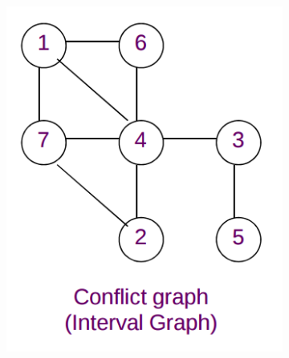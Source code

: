 \begin{figure}[H]
	\centering
	\begin{subfigure}[b]{0.19\textwidth}
		\includegraphics[width=\textwidth]{./Cap5/Images/Image11.png}
		\caption{}
		\label{fig:conflGraph}
	\end{subfigure}
	\quad\quad\quad
	\begin{subfigure}[b]{0.19\textwidth}

\end{subfigure}
\end{figure}
